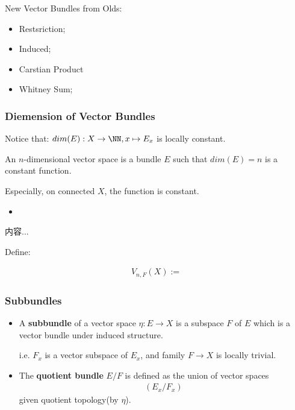 \documentclass[Total.tex]{subfiles}
\begin{document}
	New Vector Bundles from Olds:
	
	\begin{itemize}
		\item Restsriction;
		\item Induced;
		\item Carstian Product
		\item Whitney Sum;
	\end{itemize}
	
	\subsubsection{Diemension of Vector Bundles}
	
	Notice that: $dim(E):X\rightarrow \NN,x\mapsto E_x$ is locally constant. 
	
	\begin{Def}
		An $n$-dimensional vector space is a bundle $E$ such that $dim(E)=n$ is a constant function. 
		
		Especially, on connected $X$, the function is constant.
	\end{Def}
	
	\begin{itemize}
		\item 
	\end{itemize}
	
	\begin{Def}
		内容...
	\end{Def}
	
	\begin{Def}
		Define:
		
		\begin{gather*}
			V_{n,F}(X):=
		\end{gather*}
	\end{Def}
	
	\subsubsection{Subbundles}
	
	\begin{Def}
		\begin{itemize}
			\item A \textbf{subbundle} of a vector space $\eta:E\rightarrow X$ is a subspace $F$ of $E$ which is a vector bundle under induced structure.
			
			i.e. $F_x$ is a vector subspace of $E_x$, and family $F\rightarrow X$ is locally trivial. 
			
			\item The \textbf{quotient bundle} $E/F$ is defined as the union of vector spaces
			\begin{gather*}
				(E_x/F_x)
			\end{gather*}
			given quotient topology(by $\eta$). 
		\end{itemize}
	\end{Def}
	
\end{document}
